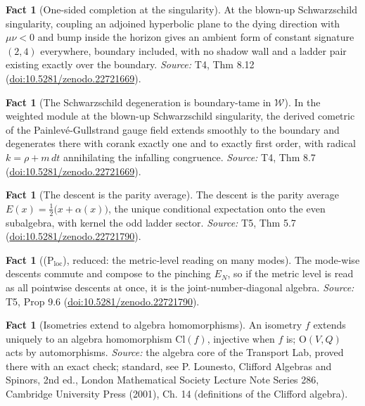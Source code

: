 \documentclass[11pt]{article}
\theoremstyle{definition}
\newtheorem{fact}[theorem]{Fact}
\theoremstyle{plain}
\providecommand{\Cl}{}\renewcommand{\Cl}{\mathrm{Cl}}
\providecommand{\EN}{}\renewcommand{\EN}{E_{N}}
\providecommand{\dtPG}{}\renewcommand{\dtPG}{dt}
\providecommand{\shW}{}\renewcommand{\shW}{\mathcal{W}}
\begin{document}
\begin{fact}[One-sided completion at the singularity]\label{c:sheaf.one-sided-completion-singularity}
At the blown-up Schwarzschild singularity, coupling an adjoined hyperbolic plane to the dying direction with $\mu\nu < 0$ and bump inside the horizon gives an ambient form of constant signature $(2,4)$ everywhere, boundary included, with no shadow wall and a ladder pair existing exactly over the boundary.
\emph{Source:} T4, Thm 8.12 (\href{https://doi.org/10.5281/zenodo.22721669}{doi:10.5281/zenodo.22721669}).
\end{fact}

\begin{fact}[The Schwarzschild degeneration is boundary-tame in $\shW$]\label{c:sheaf.schwarzschild-degeneration-boundary-tame}
In the weighted module at the blown-up Schwarzschild singularity, the derived cometric of the Painlev\'e-Gullstrand gauge field extends smoothly to the boundary and degenerates there with corank exactly one and to exactly first order, with radical $k = \rho + m\,\dtPG$ annihilating the infalling congruence.
\emph{Source:} T4, Thm 8.7 (\href{https://doi.org/10.5281/zenodo.22721669}{doi:10.5281/zenodo.22721669}).
\end{fact}

\begin{fact}[The descent is the parity average]\label{c:singularity.descent-parity-average}
The descent is the parity average $E(x) = \tfrac12\bigl(x + \alpha(x)\bigr)$, the unique conditional expectation onto the even subalgebra, with kernel the odd ladder sector.
\emph{Source:} T5, Thm 5.7 (\href{https://doi.org/10.5281/zenodo.22721790}{doi:10.5281/zenodo.22721790}).
\end{fact}

\begin{fact}[(P$_{\mathrm{loc}}$), reduced: the metric-level reading on many modes]\label{c:singularity.p-reduced-metric-level-reading-many}
The mode-wise descents commute and compose to the pinching $\EN$, so if the metric level is read as all pointwise descents at once, it is the joint-number-diagonal algebra.
\emph{Source:} T5, Prop 9.6 (\href{https://doi.org/10.5281/zenodo.22721790}{doi:10.5281/zenodo.22721790}).
\end{fact}

\begin{fact}[Isometries extend to algebra homomorphisms]\label{c:std-algebra.functoriality}
An isometry $f$ extends uniquely to an algebra homomorphism $\Cl(f)$, injective when $f$ is; $\mathrm{O}(V, Q)$ acts by automorphisms.
\emph{Source:} the algebra core of the Transport Lab, proved there with an exact check; standard, see P. Lounesto, Clifford Algebras and Spinors, 2nd ed., London Mathematical Society Lecture Note Series 286, Cambridge University Press (2001), Ch. 14 (definitions of the Clifford algebra).
\end{fact}
\end{document}
